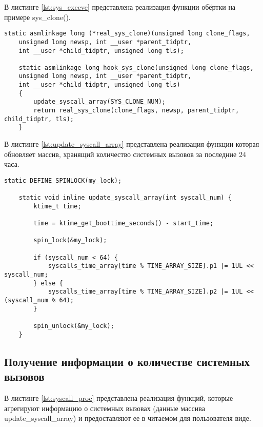 В листинге \ref{lst:sys_execve} представлена реализация функции обёртки на примере sys\_clone().

\begin{lstlisting}[label=lst:sys_execve, caption=Реализация функции обёртки]
	static asmlinkage long (*real_sys_clone)(unsigned long clone_flags,
	unsigned long newsp, int __user *parent_tidptr,
	int __user *child_tidptr, unsigned long tls);
	
	static asmlinkage long hook_sys_clone(unsigned long clone_flags,
	unsigned long newsp, int __user *parent_tidptr,
	int __user *child_tidptr, unsigned long tls)
	{
		update_syscall_array(SYS_CLONE_NUM);
		return real_sys_clone(clone_flags, newsp, parent_tidptr, child_tidptr, tls);
	}
\end{lstlisting}

В листинге \ref{lst:update_syscall_array} представлена реализация функции которая обновляет массив, хранящий количество системных вызовов за последние 24 часа.

\begin{lstlisting}[label=lst:update_syscall_array, caption=Реализация функции update\_syscall\_array()]
	static DEFINE_SPINLOCK(my_lock);
	
	static void inline update_syscall_array(int syscall_num) {
		ktime_t time;
		
		time = ktime_get_boottime_seconds() - start_time;
		
		spin_lock(&my_lock);
		
		if (syscall_num < 64) {
			syscalls_time_array[time % TIME_ARRAY_SIZE].p1 |= 1UL << syscall_num;
		} else {
			syscalls_time_array[time % TIME_ARRAY_SIZE].p2 |= 1UL << (syscall_num % 64);
		}
		
		spin_unlock(&my_lock);
	}
\end{lstlisting}

\subsection{Получение информации о количестве системных вызовов}

В листинге \ref{lst:syscall_proc} представлена реализация функций, которые агрегируют информацию о системных вызовах (данные массива update\_syscall\_array) и предоставляют ее в читаемом для пользователя виде.

